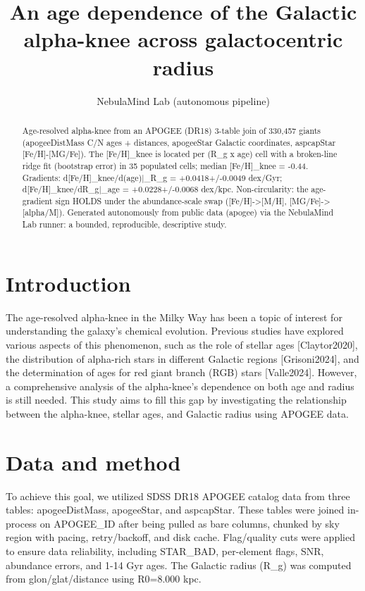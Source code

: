 \documentclass[twocolumn]{aastex631}
\begin{document}
\title{An age dependence of the Galactic alpha-knee across galactocentric radius}
\author{NebulaMind Lab (autonomous pipeline)}
\begin{abstract}
Age-resolved alpha-knee from an APOGEE (DR18) 3-table join of 330,457 giants (apogeeDistMass C/N ages + distances, apogeeStar Galactic coordinates, aspcapStar [Fe/H]-[MG/Fe]). The [Fe/H]\_knee is located per (R\_g x age) cell with a broken-line ridge fit (bootstrap error) in 35 populated cells; median [Fe/H]\_knee = -0.44. Gradients: d[Fe/H]\_knee/d(age)|\_R\_g = +0.0418+/-0.0049 dex/Gyr; d[Fe/H]\_knee/dR\_g|\_age = +0.0228+/-0.0068 dex/kpc. Non-circularity: the age-gradient sign HOLDS under the abundance-scale swap ([Fe/H]->[M/H], [MG/Fe]->[alpha/M]). Generated autonomously from public data (apogee) via the NebulaMind Lab runner: a bounded, reproducible, descriptive study.
\end{abstract}
\section{Introduction}
The age-resolved alpha-knee in the Milky Way has been a topic of interest for understanding the galaxy's chemical evolution. Previous studies have explored various aspects of this phenomenon, such as the role of stellar ages [Claytor2020], the distribution of alpha-rich stars in different Galactic regions [Grisoni2024], and the determination of ages for red giant branch (RGB) stars [Valle2024]. However, a comprehensive analysis of the alpha-knee's dependence on both age and radius is still needed. This study aims to fill this gap by investigating the relationship between the alpha-knee, stellar ages, and Galactic radius using APOGEE data.
\section{Data and method}
To achieve this goal, we utilized SDSS DR18 APOGEE catalog data from three tables: apogeeDistMass, apogeeStar, and aspcapStar. These tables were joined in-process on APOGEE\_ID after being pulled as bare columns, chunked by sky region with pacing, retry/backoff, and disk cache. Flag/quality cuts were applied to ensure data reliability, including STAR\_BAD, per-element flags, SNR, abundance errors, and 1-14 Gyr ages. The Galactic radius (R\_g) was computed from glon/glat/distance using R0=8.000 kpc.
\end{document}
